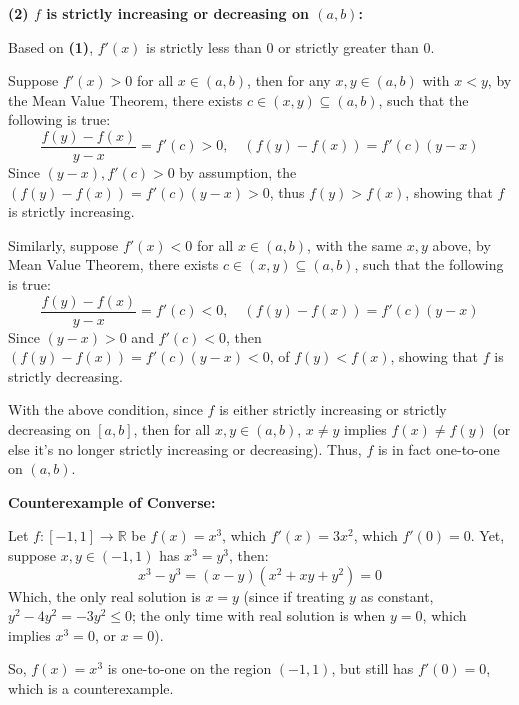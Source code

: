 \documentclass{article}
\begin{document}
\hfill

\textbf{(2) $f$ is strictly increasing or decreasing on $(a,b)$:}

Based on \textbf{(1)}, $f'(x)$ is strictly less than $0$ or strictly greater than $0$.

Suppose $f'(x)>0$ for all $x\in(a,b)$, then for any $x,y\in (a,b)$ with $x<y$, by the Mean Value Theorem, 
there exists $c\in (x,y)\subseteq (a,b)$, such that the following is true:
$$\frac{f(y)-f(x)}{y-x}=f'(c) >0,\quad (f(y)-f(x))=f'(c)(y-x)$$
Since $(y-x), f'(c)>0$ by assumption, the $(f(y)-f(x))=f'(c)(y-x)>0$, thus $f(y)>f(x)$, showing that $f$ is strictly increasing.

Similarly, suppose $f'(x)<0$ for all $x\in (a,b)$, with the same $x,y$ above, by Mean Value Theorem, there exists $c\in(x,y)\subseteq (a,b)$,
such that the following is true:
$$\frac{f(y)-f(x)}{y-x}=f'(c) <0,\quad (f(y)-f(x))=f'(c)(y-x)$$
Since $(y-x)>0$ and $f'(c)<0$, then $(f(y)-f(x))=f'(c)(y-x)<0$, of $f(y)<f(x)$, showing that $f$ is strictly decreasing.

\hfill

With the above condition, since $f$ is either strictly increasing or strictly decreasing on $[a,b]$, 
then for all $x,y\in(a,b)$, $x\neq y$ implies $f(x)\neq f(y)$ (or else it's no longer strictly increasing or decreasing).
Thus, $f$ is in fact one-to-one on $(a,b)$.

\hfill

\textbf{Counterexample of Converse:}

Let $f:[-1,1]\rightarrow \mathbb{R}$ be $f(x)=x^3$, which $f'(x)=3x^2$, which $f'(0)=0$. 
Yet, suppose $x,y\in (-1,1)$ has $x^3=y^3$, then:
$$x^3-y^3=(x-y)(x^2+xy+y^2)=0$$
Which, the only real solution is $x=y$ (since if treating $y$ as constant, $y^2-4y^2=-3y^2\leq 0$; the only time with real solution is when $y=0$, which implies $x^3=0$, or $x=0$).

So, $f(x)=x^3$ is one-to-one on the region $(-1,1)$, but still has $f'(0)=0$, which is a counterexample.

\hfill

\hfill
\end{document}
